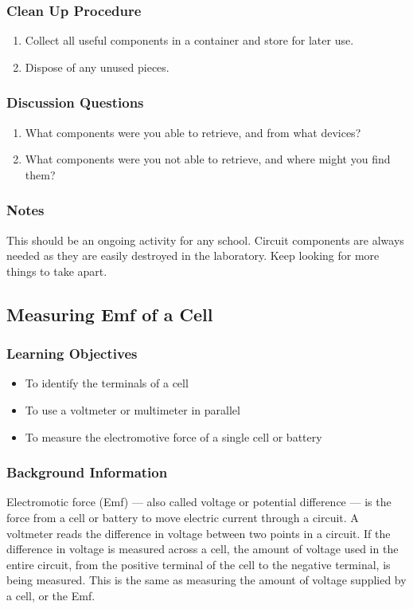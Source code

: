 \subsubsection*{Clean Up Procedure}
\begin{enumerate}
\item{Collect all useful components in a container and store for later use.} 
\item{Dispose of any unused pieces.} 
\end{enumerate}

\subsubsection*{Discussion Questions}
\begin{enumerate}
\item{What components were you able to retrieve, and from what devices?}
\item{What components were you not able to retrieve, and where might you find them?}
\end{enumerate}

\subsubsection*{Notes}
This should be an ongoing activity for any school. Circuit components are always needed as they are easily destroyed in the laboratory. Keep looking for more things to take apart. 

\subsection{Measuring Emf of a Cell}

\subsubsection*{Learning Objectives}
\begin{itemize}
\item{To identify the terminals of a cell} 
\item{To use a voltmeter or multimeter in parallel} 
\item{To measure the electromotive force of a single cell or battery} 
\end{itemize}

\subsubsection*{Background Information}
Electromotic force (Emf) --- also called voltage or potential difference --- is the force from a cell or battery to move electric current through a circuit. A voltmeter reads the difference in voltage between two points in a circuit. If the difference in voltage is measured across a cell, the amount of voltage used in the entire circuit, from the positive terminal of the cell to the negative terminal, is being measured. This is the same as measuring the amount of voltage supplied by a cell, or the Emf. 

